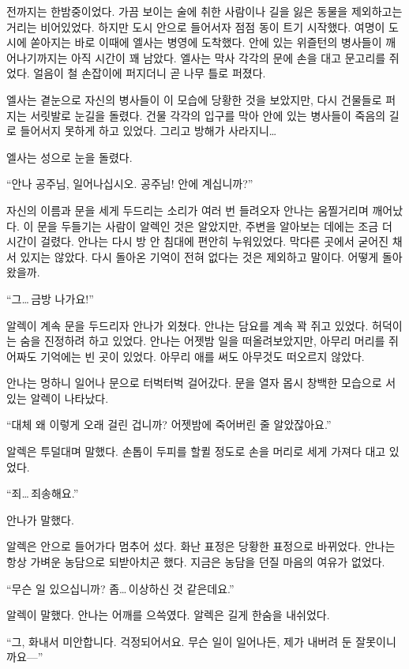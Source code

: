 전까지는 한밤중이었다. 가끔 보이는 술에 취한 사람이나 길을 잃은 동물을 제외하고는 거리는 비어있었다. 하지만 도시 안으로 들어서자 점점 동이 트기 시작했다. 여명이 도시에 쏟아지는 바로 이때에 엘사는 병영에 도착했다. 안에 있는 위즐턴의 병사들이 깨어나기까지는 아직 시간이 꽤 남았다. 엘사는 막사 각각의 문에 손을 대고 문고리를 쥐었다. 얼음이 철 손잡이에 퍼지더니 곧 나무 틀로 퍼졌다.

엘사는 곁눈으로 자신의 병사들이 이 모습에 당황한 것을 보았지만, 다시 건물들로 퍼지는 서릿발로 눈길을 돌렸다. 건물 각각의 입구를 막아 안에 있는 병사들이 죽음의 길로 들어서지 못하게 하고 있었다. 그리고 방해가 사라지니\ldots

엘사는 성으로 눈을 돌렸다.

\textbreak

\forceindent``안나 공주님, 일어나십시오. 공주님! 안에 계십니까?''

자신의 이름과 문을 세게 두드리는 소리가 여러 번 들려오자 안나는 움찔거리며 깨어났다. 이 문을 두들기는 사람이 알렉인 것은 알았지만, 주변을 알아보는 데에는 조금 더 시간이 걸렸다. 안나는 다시 방 안 침대에 편안히 누워있었다. 막다른 곳에서 굳어진 채 서 있지는 않았다. 다시 돌아온 기억이 전혀 없다는 것은 제외하고 말이다. 어떻게 돌아왔을까.

``그\ldots\,금방 나가요!''

알렉이 계속 문을 두드리자 안나가 외쳤다. 안나는 담요를 계속 꽉 쥐고 있었다. 허덕이는 숨을 진정하려 하고 있었다. 안나는 어젯밤 일을 떠올려보았지만, 아무리 머리를 쥐어짜도 기억에는 빈 곳이 있었다. 아무리 애를 써도 아무것도 떠오르지 않았다.

안나는 멍하니 일어나 문으로 터벅터벅 걸어갔다. 문을 열자 몹시 창백한 모습으로 서 있는 알렉이 나타났다.

``대체 왜 이렇게 오래 걸린 겁니까? 어젯밤에 죽어버린 줄 알았잖아요.''

알렉은 투덜대며 말했다. 손톱이 두피를 할퀼 정도로 손을 머리로 세게 가져다 대고 있었다.

``죄\ldots\,죄송해요.''

안나가 말했다.

알렉은 안으로 들어가다 멈추어 섰다. 화난 표정은 당황한 표정으로 바뀌었다. 안나는 항상 가벼운 농담으로 되받아치곤 했다. 지금은 농담을 던질 마음의 여유가 없었다.

``무슨 일 있으십니까? 좀\ldots\,이상하신 것 같은데요.''

알렉이 말했다. 안나는 어깨를 으쓱였다. 알렉은 길게 한숨을 내쉬었다.

``그, 화내서 미안합니다. 걱정되어서요. 무슨 일이 일어나든, 제가 내버려 둔 잘못이니까요—''

